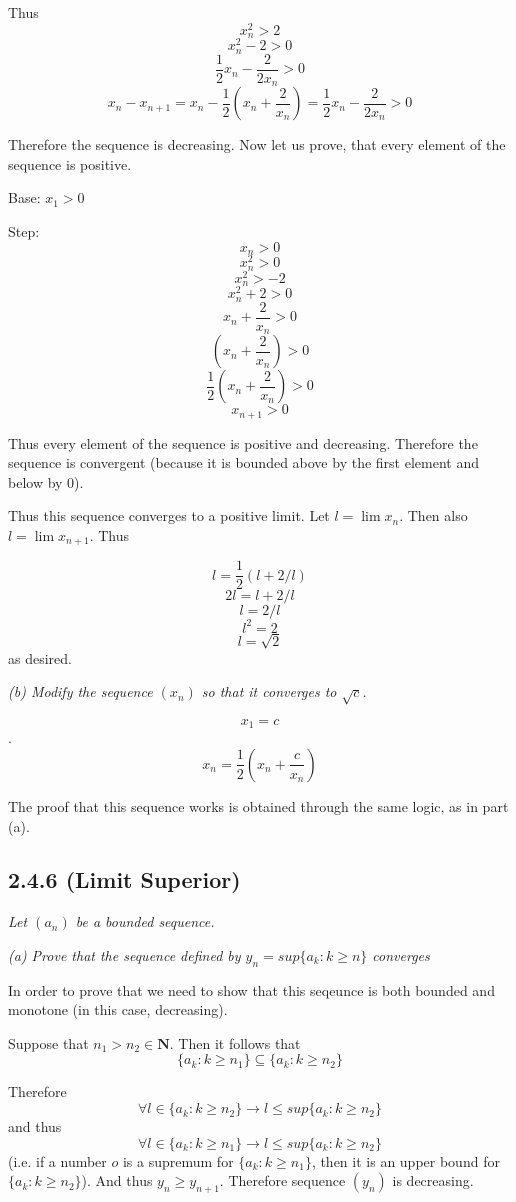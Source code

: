 \documentclass[11pt,oneside,titlepage]{book}
\begin{document}
Thus
$$x_n^2  > 2$$
$$x_n^2 - 2 > 0$$
$$\frac{1}{2}x_n - \frac{2}{2 x_n} > 0$$
$$x_n - x_{n + 1} = x_n - \frac{1}{2}(x_n + \frac{2}{x_n}) = \frac{1}{2}x_n - \frac{2}{2x_n} > 0$$

Therefore the sequence is decreasing. Now let us prove, that every element of the
sequence is positive.

Base: $x_1 > 0$

Step:
$$x_n> 0$$
$$x_n^2 > 0$$
$$x_n^2 > -2$$
$$x_n^2 + 2 > 0$$
$$x_n + \frac{2}{x_n} > 0$$
$$(x_n + \frac{2}{x_n}) > 0$$
$$\frac{1}{2}(x_n + \frac{2}{x_n}) > 0$$
$$x_{n + 1} > 0$$

Thus every element of the sequence is positive and decreasing. Therefore the
sequence is convergent (because it is bounded above by the first element and
below by 0).

Thus this sequence converges to a positive limit. Let $l = \lim x_n$. Then also
$l = \lim x_{n + 1}$. Thus

$$l = \frac{1}{2}(l + 2/l)$$
$$2 l = l + 2/l$$
$$l = 2/l$$
$$l^2 = 2$$
$$l = \sqrt{2}$$
as desired.

\textit{(b) Modify the sequence $(x_n)$ so that it converges to $\sqrt{c}$. }

$$x_1 = c$$.
$$x_n =  \frac{1}{2}(x_n + \frac{c}{x_n})$$

The proof that this sequence works is obtained through the same logic, as in part (a).

\subsection*{2.4.6 (Limit Superior)}
\textit{Let $(a_n)$ be a bounded sequence.}

\textit{(a) Prove that the sequence defined by $y_n = sup\{a_k: k \geq n\}$
  converges}

In order to prove that we need to show that this seqeunce is both bounded and
monotone (in this case, decreasing).

Suppose that $n_1 > n_2 \in \textbf{N}$. Then it follows that
$$\{a_k: k \geq n_1\} \subseteq \{a_k: k \geq n_2\}$$

Therefore 
$$\forall l \in \{a_k: k \geq n_2\} \to l \leq sup\{a_k: k \geq n_2\}$$
and thus
$$\forall l \in \{a_k: k \geq n_1\} \to l \leq sup\{a_k: k \geq n_2\}$$
(i.e. if a number $o$ is a supremum for $\{a_k: k \geq n_1\}$, then
it is an upper bound for $\{a_k: k \geq n_2\}$).
And thus $y_n \geq y_{n + 1}$. Therefore sequence $(y_n)$ is decreasing.
\end{document}
